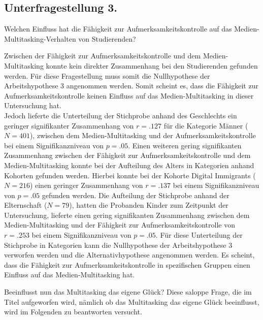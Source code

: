 \subsection{Unterfragestellung 3.} Welchen Einfluss hat die Fähigkeit zur Aufmerksamkeitskontrolle auf das Medien-Multitasking-Verhalten von Studierenden?

Zwischen der Fähigkeit zur Aufmerksamkeitskontrolle und dem Medien-Multitasking konnte kein direkter Zusammenhang bei den Studierenden gefunden werden. Für diese Fragestellung muss somit die Nullhypothese der Arbeitshypothese 3 angenommen werden. Somit scheint es, dass die Fähigkeit zur Aufmerksamkeitskontrolle keinen Einfluss auf das Medien-Multitasking in dieser Untersuchung hat. \\
Jedoch lieferte die Unterteilung der Stichprobe anhand des Geschlechts ein geringer signifikanter Zusammenhang von $r=.127$ für die Kategorie Männer ($N=401$), zwischen dem Medien-Multitasking und der Aufmerksamkeitskontrolle bei einem Signifikanzniveau von $p=.05$. Einen weiteren gering signifikanten Zusammenhang zwischen der Fähigkeit zur Aufmerksamkeitskontrolle und dem Medien-Multitasking konnte bei der Aufteilung des Alters in Kategorien anhand Kohorten gefunden werden. Hierbei konnte bei der Kohorte Digital Immigrants ($N=216$) einen geringer Zusammenhang von $r=.137$ bei einem Signifikanzniveau von $p=.05$ gefunden werden. Die Aufteilung der Stichprobe anhand der Elternschaft ($N=79$), hatten die Probanden Kinder zum Zeitpunkt der Untersuchung, lieferte einen gering signifikanten Zusammenhang zwischen dem Medien-Multitasking und der Fähigkeit zur Aufmerksamkeitskontrolle von $r=.253$ bei einem Signifikanzniveau von $p=.05$. Für diese Unterteilung der Stichprobe in Kategorien kann die Nullhypothese der Arbeitshypothese 3 verworfen werden und die Alternativhypothese angenommen werden. Es scheint, dass die Fähigkeit zur Aufmerksamkeitskontrolle in spezifischen Gruppen einen Einfluss auf das Medien-Multitasking hat.

\label{section.diskussion.interpretation}
Beeinflusst nun das Multitasking das eigene Glück? Diese saloppe Frage, die im Titel aufgeworfen wird, nämlich ob das Multitasking das eigene Glück beeinflusst, wird im Folgenden zu beantworten versucht. 
